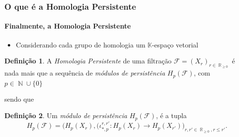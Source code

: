 \documentclass[11pt]{beamer}
\DeclareMathOperator{\R}{\mathbb{R}}
\DeclareMathOperator{\N}{\mathbb{N}}
\theoremstyle{remark}
\theoremstyle{definition}
\newtheorem{definicao}{Definição}
\theoremstyle{plain}
\begin{document}
    \begin{frame}
        \frametitle{O que é a Homologia Persistente}
        \framesubtitle{Finalmente, a Homologia Persistente}

        \begin{itemize}
            \item 
                Considerando cada grupo de homologia um $\mathbb{K}$-espaço
                vetorial
        \end{itemize}

                \begin{definicao}
                    A \emph{Homologia Persistente} de uma filtração
                    $\mathcal{F} = (X_r)_{r\in \R_{\geq 0}}$ é nada mais
                    que a sequência de \emph{módulos de persistência}
                    $H_p(\mathcal{F})$, com $p \in \N \cup \{0\}$
                \end{definicao}

                sendo que
                \begin{definicao}
                    Um \emph{módulo de persistência} $H_p(\mathcal{F})$,
                    é a tupla
                    \begin{equation*}
                        H_p(\mathcal{F}) 
                        =
                        \big(
                            H_p(X_r),
                            (\iota_{\ast,p}^{r,r'}: H_p(X_r) \to H_p(X_{r'})
                        \big)_{r,r'\in \R_{\geq 0}, r \leq r'}.
                    \end{equation*}
                \end{definicao}

    \end{frame}
\end{document}
